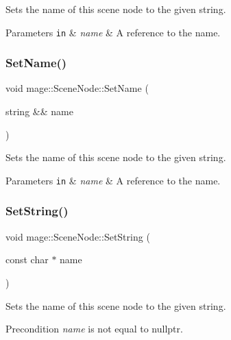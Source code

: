 Sets the name of this scene node to the given string.


\begin{DoxyParams}[1]{Parameters}
\mbox{\tt in}  & {\em name} & A reference to the name. \\
\hline
\end{DoxyParams}
\hypertarget{classmage_1_1_scene_node_a3dc6b033a811a9e1d6da0aa85b4f281b}{}\label{classmage_1_1_scene_node_a3dc6b033a811a9e1d6da0aa85b4f281b} 
\subsubsection{\texorpdfstring{Set\+Name()}{SetName()}\hspace{0.1cm}{\footnotesize\ttfamily [2/2]}}
{\footnotesize\ttfamily void mage\+::\+Scene\+Node\+::\+Set\+Name (\begin{DoxyParamCaption}\item[{string \&\&}]{name }\end{DoxyParamCaption})\hspace{0.3cm}{\ttfamily [noexcept]}}

Sets the name of this scene node to the given string.


\begin{DoxyParams}[1]{Parameters}
\mbox{\tt in}  & {\em name} & A reference to the name. \\
\hline
\end{DoxyParams}
\hypertarget{classmage_1_1_scene_node_addebab8c69bbd8a767d2f37bb2ef0ed5}{}\label{classmage_1_1_scene_node_addebab8c69bbd8a767d2f37bb2ef0ed5} 
\subsubsection{\texorpdfstring{Set\+String()}{SetString()}}
{\footnotesize\ttfamily void mage\+::\+Scene\+Node\+::\+Set\+String (\begin{DoxyParamCaption}\item[{const char $\ast$}]{name }\end{DoxyParamCaption})}

Sets the name of this scene node to the given string.

\begin{DoxyPrecond}{Precondition}
{\itshape name} is not equal to {\ttfamily nullptr}. 
\end{DoxyPrecond}


